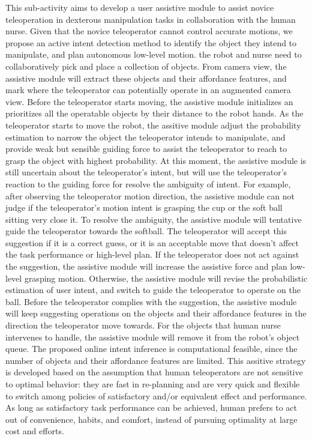 \documentclass[letterpaper, 11 pt, onecolumn]{article}
\begin{document}
This sub-activity aims to develop a user assistive module to assist novice teleoperation in dexterous manipulation tasks in collaboration with the human nurse. Given that the novice teleoperator cannot control accurate motions, we propose an active intent detection method to identify the object they intend to manipulate, and plan autonomous low-level motion. the robot and nurse need to collaboratively pick and place a collection of objects. From camera view, the assistive module will extract these objects and their affordance features, and mark where the teleoperator can potentially operate in an augmented camera view. Before the teleoperator starts moving, the assistive module initializes an prioritizes all the operatable objects by their distance to the robot hands. As the teleoperator starts to move the robot, the assitive module adjust the probability estimation to narrow the object the teleoperator intends to manipulate, and provide weak but sensible guiding force to assist the teleoperator to reach to grasp the object with highest probability. At this moment, the assistive module is still uncertain about the teleoperator's intent, but will use the teleoperator's reaction to the guiding force for resolve the ambiguity of intent. For example, after observing the teleoperator motion direction, the assistive module can not judge if the teleoperator's motion intent is grasping the cup or the soft ball sitting very close it. To resolve the ambiguity, the assistive module will tentative guide the teleoperator towards the softball. The teleoperator will accept this suggestion if it is a correct guess, or it is an acceptable move that doesn't affect the task performance or high-level plan. If the teleoperator does not act against the suggestion, the assistive module will increase the assistive force and plan low-level grasping motion. Otherwise, the assistive module will revise the probabilistic estimation of user intent, and switch to guide the teleoperator to operate on the ball. Before the teleoperator complies with the suggestion, the assistive module will keep suggesting operations on the objects and their affordance features in the direction the teleoperator move towards. For the objects that human nurse intervenes to handle, the assistive module will remove it from the robot's object queue. The proposed online intent inference is computational feasible, since the number of objects and their affordance features are limited. This assitive strategy is developed based on the assumption that human teleoperators are not sensitive to optimal behavior: they are fast in re-planning and are very quick and flexible to switch among policies of satisfactory and/or equivalent effect and performance. As long as satisfactory task performance can be achieved, human prefers to act out of convenience, habits, and comfort, instead of pursuing optimality at large cost and efforts. 
\end{document}
